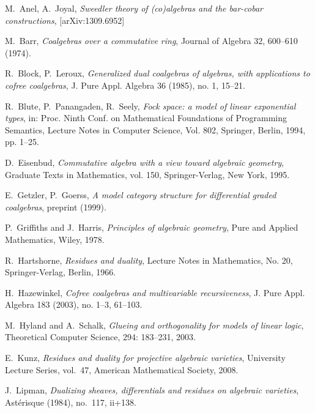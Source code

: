 \documentclass[english,letter paper,12pt,reqno]{article}
\theoremstyle{example}
\numberwithin{equation}{section}
\begin{document}

\providecommand{\bysame}{\leavevmode\hbox to3em{\hrulefill}\thinspace}
\providecommand{\href}[2]{#2}
\begin{thebibliography}{BHLS03}

M.~Anel, A.~Joyal, \textsl{Sweedler theory of (co)algebras and the bar-cobar constructions}, \href{http://arxiv.org/abs/1309.6952}{[arXiv:1309.6952]}

M.~Barr, \textsl{Coalgebras over a commutative ring}, Journal of Algebra 32, 600--610 (1974).

R.~Block, P.~Leroux, \textsl{Generalized dual coalgebras of algebras, with applications to cofree coalgebras}, J. Pure Appl. Algebra 36 (1985), no. 1, 15--21.

R.~Blute, P.~Panangaden, R.~Seely, \textsl{Fock space: a model of linear exponential types}, in: Proc. Ninth Conf. on Mathematical Foundations of Programming Semantics, Lecture Notes in Computer Science, Vol. 802, Springer, Berlin, 1994, pp. 1--25.
  
D.~Eisenbud, \textsl{Commutative algebra with a view toward algebraic geometry},
  Graduate Texts in Mathematics, vol. 150, Springer-Verlag, New York, 1995. 

E.~Getzler, P.~Goerss, \emph{A model category structure for differential graded coalgebras}, preprint (1999).
  
P.~Griffiths and J.~Harris, \textsl{Principles of algebraic geometry}, Pure and
  Applied Mathematics, Wiley, 1978.
  
R.~Hartshorne, \textsl{Residues and duality}, Lecture Notes in Mathematics,
  No. 20, Springer-Verlag, Berlin, 1966. 
  
H.~Hazewinkel, \textsl{Cofree coalgebras and multivariable recursiveness}, J. Pure Appl. Algebra 183 (2003), no. 1--3, 61--103.

M.~Hyland and A.~Schalk, \textsl{Glueing and orthogonality for models of linear logic}, Theoretical Computer Science, 294: 183--231, 2003.

E.~Kunz, \emph{Residues and duality for projective algebraic varieties},
  University Lecture Series, vol.~47, American Mathematical Society, 2008.
    
J.~Lipman, \textsl{Dualizing sheaves, differentials and residues on algebraic
  varieties}, Ast\'erisque (1984), no.~117, ii+138.


\end{thebibliography}
\end{document}
